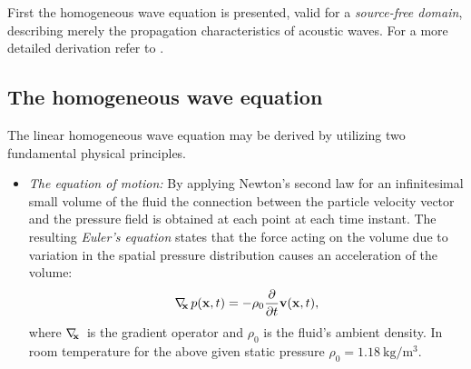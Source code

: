 First the homogeneous wave equation is presented, valid for a \emph{source-free domain}, describing merely the propagation characteristics of acoustic waves.
For a more detailed derivation refer to \cite{Beranek1993, Morse1968, Williams1999, Blackstock2000}.

\subsection{The homogeneous wave equation}
%
The linear homogeneous wave equation may be derived by utilizing two fundamental physical principles.
\begin{itemize}
\item \emph{The equation of motion:} By applying Newton's second law for an infinitesimal small volume of the fluid the connection between the particle velocity vector and the pressure field is obtained at each point at each time instant. 
The resulting \emph{Euler's equation} states that the force acting on the volume due to variation in the spatial pressure distribution causes an acceleration of the volume:
\begin{equation}
\nabla_{\!\!\mathbf{x}}\, p(\mathbf{x},t) = -\rho_0 \frac{\partial}{\partial t} \mathbf{v}(\mathbf{x},t),
\label{Eq:Theory:Eulers_equation}
\end{equation}
where $\nabla_{\!\!\mathbf{x}}\,$ is the gradient operator and $\rho_0$ is the fluid's ambient density. 
In room temperature for the above given static pressure $\rho_0 = 1.18~\mathrm{kg}/\mathrm{m}^3$.


\end{itemize}
